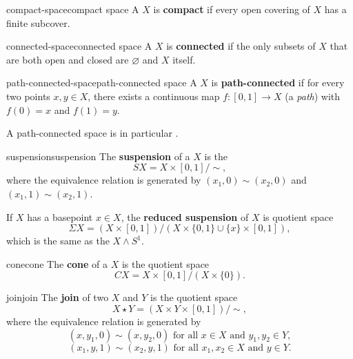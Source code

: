 \begin{topic}{compact-space}{compact space}
    A  $X$ is \textbf{compact} if every open covering of $X$ has a finite subcover.
\end{topic}

\begin{topic}{connected-space}{connected space}
    A  $X$ is \textbf{connected} if the only subsets of $X$ that are both open and closed are $\varnothing$ and $X$ itself.
\end{topic}

\begin{topic}{path-connected-space}{path-connected space}
    A  $X$ is \textbf{path-connected} if for every two points $x, y \in X$, there exists a continuous map $f : [0, 1] \to X$ (a \textit{path}) with $f(0) = x$ and $f(1) = y$.
    
    A path-connected space is in particular .
\end{topic}

\begin{topic}{suspension}{suspension}
    The \textbf{suspension} of a  $X$ is the 
    \[ S X = X \times [0, 1] / \sim{} , \]
    where the equivalence relation is generated by $(x_1, 0) \sim{} (x_2, 0)$ and $(x_1, 1) \sim{} (x_2, 1)$.
    
    If $X$ has a basepoint $x \in X$, the \textbf{reduced suspension} of $X$ is quotient space
    \[ \Sigma X = (X \times [0, 1]) / (X \times \{ 0, 1 \} \cup \{ x \} \times [0, 1]) , \]
    which is the same as the  $X \wedge S^1$.
\end{topic}

\begin{topic}{cone}{cone}
    The \textbf{cone} of a  $X$ is the quotient space
    \[ CX = X \times [0, 1] / (X \times \{ 0 \}) . \]
\end{topic}

\begin{topic}{join}{join}
    The \textbf{join} of two  $X$ and $Y$ is the quotient space
    \[ X \star Y = (X \times Y \times [0, 1]) / \sim{} , \]
    where the equivalence relation is generated by
    \[ (x, y_1, 0) \sim{} (x, y_2, 0) \text{ for all } x \in X \text{ and } y_1, y_2 \in Y , \]
    \[ (x_1, y, 1) \sim{} (x_2, y, 1) \text{ for all } x_1, x_2 \in X \text{ and } y \in Y . \]
\end{topic}

